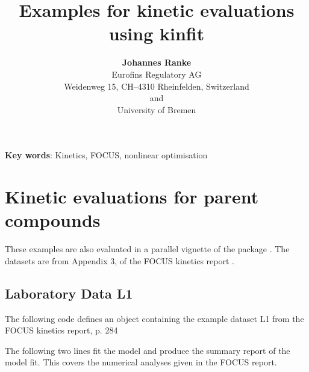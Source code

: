 \documentclass[12pt,a4paper]{article}
\begin{document}
\title{Examples for kinetic evaluations using kinfit}
\author{\textbf{Johannes Ranke} \\[0.5cm]
Eurofins Regulatory AG\\
Weidenweg 15, CH--4310 Rheinfelden, Switzerland\\[0.5cm]
and\\[0.5cm]
University of Bremen\\
}
\maketitle


\thispagestyle{empty} \setcounter{page}{0}

\clearpage

\tableofcontents

\textbf{Key words}: Kinetics, FOCUS, nonlinear optimisation

\section{Kinetic evaluations for parent compounds}
\label{intro}

These examples are also evaluated in a parallel vignette of the
 package \citep{pkg:mkin}. The datasets are from Appendix 3,
of the FOCUS kinetics report \citep{FOCUS2006, FOCUSkinetics2011}.

\subsection{Laboratory Data L1}

The following code defines an object containing the example dataset L1 from the
FOCUS kinetics report, p. 284

\begin{Schunk}
\end{Schunk}

The following two lines fit the model and produce the summary report
of the model fit. This covers the numerical analyses given in the 
FOCUS report.
\end{document}
